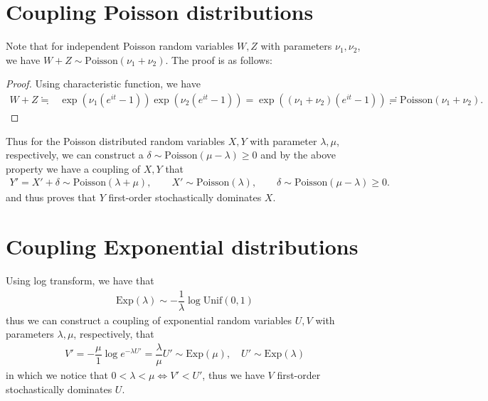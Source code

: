 \documentclass[11pt,a4paper]{article}
\numberwithin{equation}{section}%
\begin{document}
\section{Coupling Poisson distributions}

Note that for independent Poisson random variables $ W,Z $ with parameters $ \nu _1,\nu _2 $, we have $ W+Z\sim \mathrm{ Poisson }(\nu _1+\nu _2)  $. The proof is as follows:
\begin{proof}
    Using characteristic function, we have
    \begin{align*}
        W+Z\fallingdotseq & \exp\left( \nu _1(e^{it}-1) \right) \exp\left( \nu _2(e^{it}-1) \right) = \exp\left( (\nu _1+\nu _2)(e^{it}-1) \right) \risingdotseq \mathrm{ Poisson }(\nu _1+\nu _2) .
    \end{align*}    
\end{proof}

Thus for the Poisson distributed random variables $ X,Y $ with parameter $ \lambda ,\mu  $, respectively, we can construct a $ \delta \sim \mathrm{ Poisson }(\mu -\lambda ) \geq 0  $ and by the above property we have a coupling of $ X,Y $ that 
\begin{align*}
    Y' = X'+\delta \sim \mathrm{ Poisson }(\lambda +\mu ),\qquad X'\sim \mathrm{ Poisson }(\lambda ),\qquad \delta \sim \mathrm{ Poisson }(\mu -\lambda ) \geq 0.
\end{align*}
and thus proves that $ Y $ first-order stochastically dominates $ X $.


    


\section{Coupling Exponential distributions}
Using log transform, we have that 
\begin{align*}
    \mathrm{ Exp }(\lambda ) \sim -\dfrac{ 1 }{ \lambda  }  \log \mathrm{ Unif }(0,1) 
\end{align*}
thus we can construct a coupling of exponential random variables $ U,V $ with parameters $ \lambda ,\mu  $, respectively, that
\begin{align*}
    V'= -\dfrac{ \mu  }{ 1 }\log e^{-\lambda U'} = \dfrac{ \lambda  }{ \mu  }U'  \sim \mathrm{ Exp }(\mu )   ,\quad U'\sim \mathrm{ Exp }(\lambda )
\end{align*}
in which we notice that $ 0<\lambda <\mu  \Leftrightarrow V'< U' $, thus we have $ V $ first-order stochastically dominates $ U $.


















    
\end{document}
